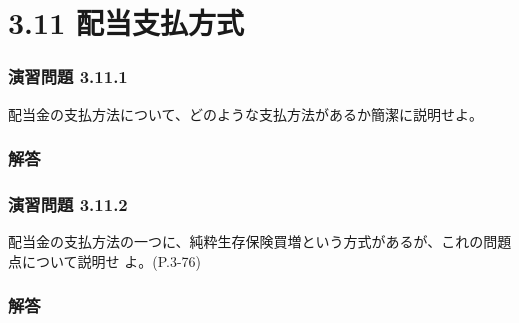 \documentclass[report,gutter=10mm,fore-edge=10mm,uplatex,dvipdfmx]{jlreq}
\begin{document}
\section{3.11 配当支払方式}
\subsubsection{演習問題 3.11.1}
配当金の支払方法について、どのような支払方法があるか簡潔に説明せよ。
\subsubsection{解答}


\subsubsection{演習問題 3.11.2}
配当金の支払方法の一つに、純粋生存保険買増という方式があるが、これの問題点について説明せ
よ。(P.3-76)
\subsubsection{解答}
\end{document}
